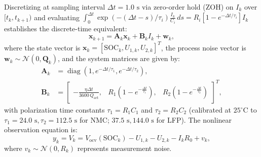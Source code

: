 \documentclass[preprint,12pt]{elsarticle}
\begin{document}
Discretizing at sampling interval $\Delta t = 1.0\text{ s}$ via zero-order hold (ZOH) on $I_k$ over $[t_k, t_{k+1})$ and evaluating $\int_0^{\Delta t} \exp(-(\Delta t - s)/\tau_i) \frac{I_k}{C_i}\,ds = R_i [1 - e^{-\Delta t/\tau_i}] I_k$ establishes the discrete-time equivalent:
\begin{equation}\label{eqn:state_space_discrete}
\mathbf{x}_{k+1} = \mathbf{A}_k \mathbf{x}_k + \mathbf{B}_k I_k + \mathbf{w}_k,
\end{equation}
where the state vector is $\mathbf{x}_k = [\text{SOC}_k, U_{1,k}, U_{2,k}]^T$, the process noise vector is $\mathbf{w}_k \sim \mathcal{N}(0, \mathbf{Q}_k)$, and the system matrices are given by:
\begin{align}
\mathbf{A}_k &= \operatorname{diag}\left(1, e^{-\Delta t/\tau_1}, e^{-\Delta t/\tau_2}\right), \label{eqn:Ak_mat} \\
\mathbf{B}_k &= \begin{bmatrix}
-\frac{\eta \Delta t}{3600\,Q_{\text{act}}}, & R_1\left(1 - e^{-\frac{\Delta t}{\tau_1}}\right), & R_2\left(1 - e^{-\frac{\Delta t}{\tau_2}}\right)
\end{bmatrix}^T, \label{eqn:Bk_mat}
\end{align}
with polarization time constants $\tau_1 = R_1 C_1$ and $\tau_2 = R_2 C_2$ (calibrated at $25^\circ\text{C}$ to $\tau_1 = 24.0\text{ s}, \tau_2 = 112.5\text{ s}$ for NMC; $37.5\text{ s}, 144.0\text{ s}$ for LFP). The nonlinear observation equation is:
\begin{equation}\label{eqn:measurement_eq}
y_k = V_k = V_{\text{ocv}}(\text{SOC}_k) - U_{1,k} - U_{2,k} - I_k R_0 + v_k,
\end{equation}
where $v_k \sim \mathcal{N}(0, R_k)$ represents measurement noise.
\end{document}
